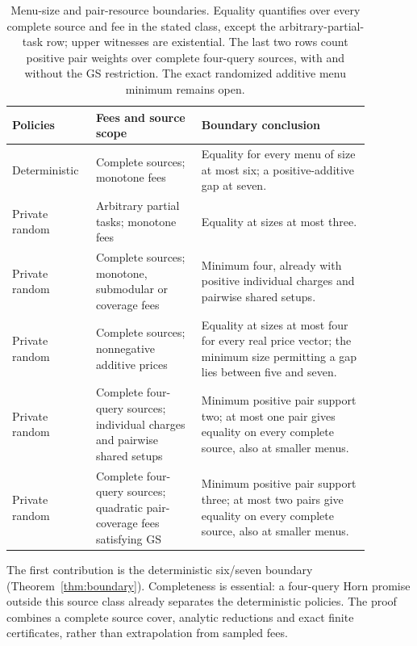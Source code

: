 \documentclass[pdflatex,sn-mathphys-num]{sn-jnl}
\theoremstyle{thmstyleone}
\theoremstyle{thmstylethree}
\theoremstyle{thmstyletwo}
\begin{document}
\begin{table}[ht]
\centering\small
\begin{tabular}{@{}p{0.18\linewidth}p{0.27\linewidth}p{0.43\linewidth}@{}}
\toprule
Policies & Fees and source scope & Boundary conclusion\\
\midrule
Deterministic & Complete sources; monotone fees
& Equality for every menu of size at most six; a positive-additive gap at seven.\\[3pt]
Private random & Arbitrary partial tasks; monotone fees
& Equality at sizes at most three.\\[3pt]
Private random & Complete sources; monotone, submodular or coverage fees
& Minimum four, already with positive individual charges and pairwise shared setups.\\[3pt]
Private random & Complete sources; nonnegative additive prices
& Equality at sizes at most four for every real price vector; the minimum size permitting a gap lies between five and seven.\\[3pt]
Private random & Complete four-query sources; individual charges and pairwise shared setups
& Minimum positive pair support two; at most one pair gives equality on every complete source, also at smaller menus.\\[3pt]
Private random & Complete four-query sources; quadratic pair-coverage fees satisfying GS
& Minimum positive pair support three; at most two pairs give equality on every complete source, also at smaller menus.\\
\bottomrule
\end{tabular}
\caption{Menu-size and pair-resource boundaries. Equality quantifies
over every complete source and fee in the stated class, except the
arbitrary-partial-task row; upper witnesses are existential. The last two rows
count positive pair weights over complete four-query sources, with
and without the GS restriction. The exact
randomized additive menu minimum remains open.}
\label{tab:core-boundaries}
\end{table}

The first contribution is the deterministic six/seven boundary
(Theorem~\ref{thm:boundary}). Completeness is essential: a four-query Horn
promise outside this source class already separates the deterministic
policies. The proof combines a complete source cover, analytic reductions
and exact finite certificates, rather than extrapolation from sampled fees.
\end{document}

